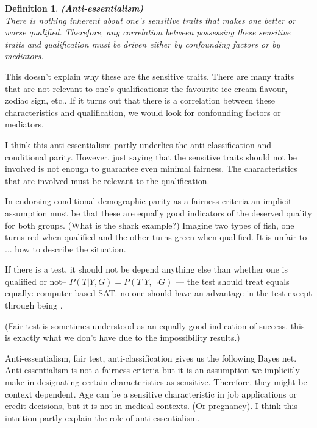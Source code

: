 \documentclass{article}
\newtheorem{definition}{Definition}
\begin{document}
\begin{definition}
\textup{\textbf{ (Anti-essentialism) } \\
There is nothing \textit{inherent} about one’s sensitive traits that makes one better or worse qualified. Therefore, any correlation between possessing these sensitive traits and qualification must be driven either by confounding factors or by mediators.}
\end{definition}

This doesn't explain why these are the sensitive traits. There are many traits that are not relevant to one's qualifications: the favourite ice-cream flavour, zodiac sign, etc.. If it turns out that there is a correlation between these characteristics and qualification, we would look for confounding factors or mediators. 

I think this anti-essentialism partly underlies the anti-classification and conditional parity. However, just saying that the sensitive traits should not be involved is not enough to guarantee even minimal fairness. The characteristics that are involved must be relevant to the qualification. 

In endorsing conditional demographic parity as a fairness criteria an implicit assumption must be that these are equally good indicators of the deserved quality for both groups. (What is the shark example?) Imagine two types of fish, one turns red when qualified and the other turns green when qualified. It is unfair to ... how to describe the situation. 


If there is a test, it should not be depend anything else than whether one is qualified or not-- $ P(T|Y, G) =  P(T|Y, \neg G)$ --- the test should treat equals equally: computer based SAT. no one should have an advantage in the test except through being . 

(Fair test is sometimes understood as an equally good indication of success. this is exactly what we don't have due to the impossibility results.)

Anti-essentialism, fair test, anti-classification gives us the following Bayes net. Anti-essentialism is not a fairness criteria but it is an assumption we implicitly make in designating certain characteristics as sensitive. Therefore, they might be context dependent. Age can be a sensitive characteristic in job applications or credit decisions, but it is not in medical contexts. (Or pregnancy). I think this intuition partly explain the role of anti-essentialism.
\end{document}
